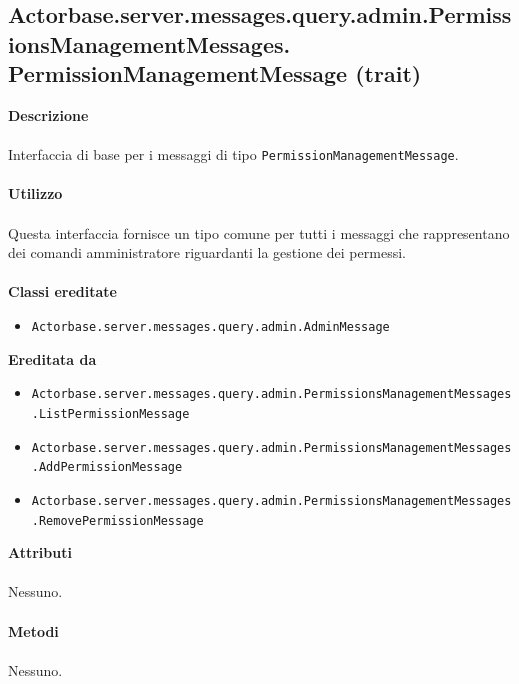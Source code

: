 \documentclass[a4paper]{article}
\begin{document}
	\subsection{Actorbase.server.messages.query.admin.PermissionsManagementMessages.
	\newline PermissionManagementMessage (trait)}
		\textbf{Descrizione}
			\\ \\
			Interfaccia di base per i messaggi di tipo \texttt{PermissionManagementMessage}.
			\\ \\
		\textbf{Utilizzo}
			\\ \\
			Questa interfaccia fornisce un tipo comune per tutti i messaggi che rappresentano dei comandi amministratore riguardanti la gestione dei permessi.
			\\ \\
		\textbf{Classi ereditate}
			\begin{itemize}
				\item \texttt{Actorbase.server.messages.query.admin.AdminMessage}
			\end{itemize}
		\textbf{Ereditata da}
			\begin{itemize}
				\item \texttt{Actorbase.server.messages.query.admin.PermissionsManagementMessages.ListPermissionMessage}
				\item \texttt{Actorbase.server.messages.query.admin.PermissionsManagementMessages.AddPermissionMessage}
				\item \texttt{Actorbase.server.messages.query.admin.PermissionsManagementMessages.RemovePermissionMessage}		
			\end{itemize}
		\textbf{Attributi}
			\\ \\
			Nessuno.
			\\ \\
		\textbf{Metodi}
			\\ \\
			Nessuno.
			
\end{document}
